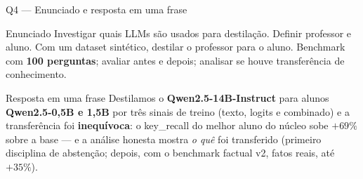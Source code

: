 \documentclass[10pt,aspectratio=169]{beamer}
\newcommand{\ganho}[1]{\textcolor{okgreen}{\textbf{#1}}}
\begin{document}
\begin{frame}{Q4 — Enunciado e resposta em uma frase}
  \begin{block}{Enunciado}
    Investigar quais LLMs são usados para destilação. Definir professor e aluno. Com um dataset
    sintético, destilar o professor para o aluno. Benchmark com \textbf{100 perguntas}; avaliar
    antes e depois; analisar se houve transferência de conhecimento.
  \end{block}
  \vspace{4pt}
  \begin{alertblock}{Resposta em uma frase}
    Destilamos o \textbf{Qwen2.5-14B-Instruct} para alunos \textbf{Qwen2.5-0,5B e 1,5B} por três
    sinais de treino (texto, logits e combinado) e a transferência foi \textbf{inequívoca}:
    o key\_recall do melhor aluno do núcleo sobe \ganho{$+69\%$} sobre a base — e a análise honesta
    mostra \emph{o quê} foi transferido (primeiro disciplina de abstenção; depois, com o benchmark
    factual v2, fatos reais, até \ganho{$+35\%$}).
  \end{alertblock}
\end{frame}
\end{document}
